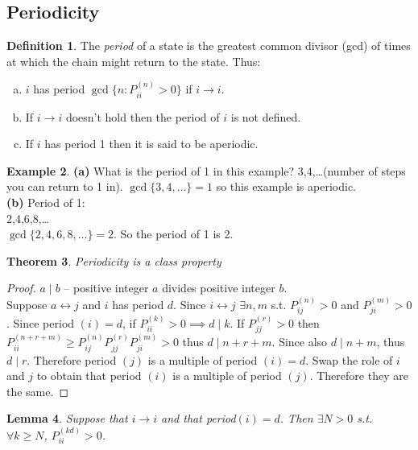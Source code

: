 \documentclass{article}
\newtheorem{thm}{Theorem}
\newtheorem{lem}[thm]{Lemma}
\theoremstyle{definition}
\newtheorem{defn}[thm]{Definition}
\newtheorem{ex}[thm]{Example}
\begin{document}
\subsection{Periodicity}
\begin{defn}
The \emph{period} of a state is the greatest common divisor (gcd) of times at which the chain might return to the state. Thus:
\begin{enumerate}[(a)]
\item $i$ has period $\gcd\{n \colon P_{ii}^{(n)} > 0\}$ if $i \rightarrow i$.
\item If $i\rightarrow i$ doesn't hold then the period of $i$ is not defined.
\item If $i$ has period 1 then it is said to be aperiodic.
\end{enumerate}
\end{defn}

\begin{ex}
\textbf{(a)}
What is the period of 1 in this example? 3,4,\ldots (number of steps you can return to 1 in).
$\gcd\{3,4,\ldots\} = 1$ so this example is aperiodic.\\
\textbf{(b)}
Period of 1: \\
2,4,6,8,\ldots \\
$\gcd\{2,4,6,8,\ldots\} = 2$.
So the period of 1 is 2.
\end{ex}

\begin{thm} Periodicity is a class property \end{thm}
\begin{proof}
$a\mid b$ -- positive integer $a$ divides positive integer $b$. \\
Suppose $a\leftrightarrow j$ and $i$ has period $d$.
Since $i\leftrightarrow j$ $\exists n,m$ s.t. $P_{ij}^{(n)} > 0$ and $P_{ji}^{(m)}>0$.
Since period $(i) = d$, if $P_{ii}^{(k)}>0 \implies d\mid k$.
If $P_{jj}^{(r)}> 0$ then $P_{ii}^{(n+r+m)} \ge P_{ij}^{(n)}P_{jj}^{(r)}P_{ji}^{(m)}>0$ thus $d\mid n+r+m$.
Since also $d\mid n+m$, thus $d\mid r$.
Therefore period $(j)$ is a multiple of period $(i) = d$.
Swap the role of $i$ and $j$ to obtain that period $(i)$ is a multiple of period $(j)$.
Therefore they are the same.
\end{proof}

\begin{lem}
Suppose that $i\rightarrow i$ and that period$(i) = d$.
Then $\exists N>0$ s.t. $\forall k\ge N$, $P_{ii}^{(kd)} >0$.
\end{lem}
\end{document}
